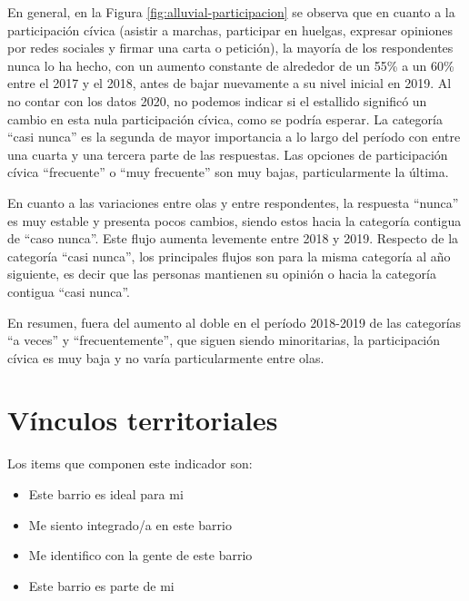 \documentclass[
  12pt,
]{book}
\begin{document}
En general, en la Figura \ref{fig:alluvial-participacion} se observa que en cuanto a la participación cívica (asistir a marchas, participar en huelgas, expresar opiniones por redes sociales y firmar una carta o petición), la mayoría de los respondentes nunca lo ha hecho, con un aumento constante de alrededor de un 55\% a un 60\% entre el 2017 y el 2018, antes de bajar nuevamente a su nivel inicial en 2019. Al no contar con los datos 2020, no podemos indicar si el estallido significó un cambio en esta nula participación cívica, como se podría esperar. La categoría ``casi nunca'' es la segunda de mayor importancia a lo largo del período con entre una cuarta y una tercera parte de las respuestas. Las opciones de participación cívica ``frecuente'' o ``muy frecuente'' son muy bajas, particularmente la última.

En cuanto a las variaciones entre olas y entre respondentes, la respuesta ``nunca'' es muy estable y presenta pocos cambios, siendo estos hacia la categoría contigua de ``caso nunca''. Este flujo aumenta levemente entre 2018 y 2019. Respecto de la categoría ``casi nunca'', los principales flujos son para la misma categoría al año siguiente, es decir que las personas mantienen su opinión o hacia la categoría contigua ``casi nunca''.

En resumen, fuera del aumento al doble en el período 2018-2019 de las categorías ``a veces'' y ``frecuentemente'', que siguen siendo minoritarias, la participación cívica es muy baja y no varía particularmente entre olas.

\hypertarget{vuxednculos-territoriales-1}{%
\section{Vínculos territoriales}\label{vuxednculos-territoriales-1}}

Los items que componen este indicador son:

\begin{itemize}
\item
  Este barrio es ideal para mi
\item
  Me siento integrado/a en este barrio
\item
  Me identifico con la gente de este barrio
\item
  Este barrio es parte de mi
\end{itemize}
\end{document}
